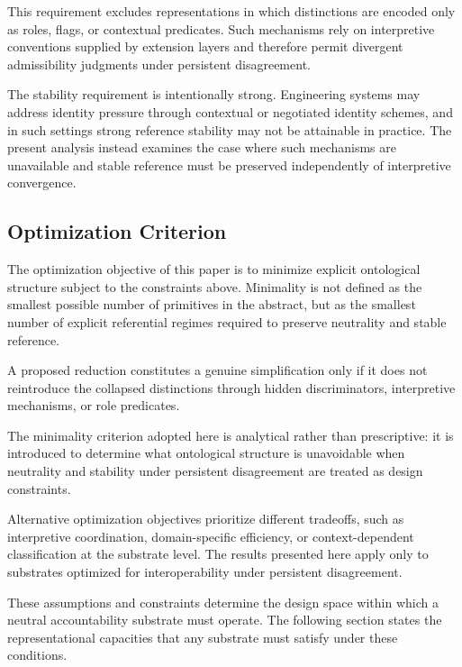This requirement excludes representations in which \stabilitycritical{}
distinctions are encoded only as roles, flags, or contextual predicates.
Such mechanisms rely on interpretive conventions supplied by extension layers
and therefore permit divergent admissibility judgments under persistent
disagreement.

The stability requirement is intentionally strong.
Engineering systems may address identity pressure through contextual
or negotiated identity schemes, and in such settings strong reference
stability may not be attainable in practice.
The present analysis instead examines the case
where such mechanisms are unavailable and
stable reference must be preserved independently of interpretive convergence.

\subsection{Optimization Criterion}

The optimization objective of this paper is to minimize explicit ontological
structure subject to the constraints above.
Minimality is not defined as
the smallest possible number of primitives in the abstract,
but as the smallest number of explicit referential
regimes required to preserve neutrality and stable reference.

A proposed reduction constitutes a genuine simplification only if it does not
reintroduce the collapsed distinctions through hidden discriminators,
interpretive mechanisms, or role predicates.

The minimality criterion adopted here is analytical rather than prescriptive:
it is introduced to determine what ontological structure
is unavoidable when neutrality and stability under persistent disagreement
are treated as design constraints.

Alternative optimization objectives prioritize different tradeoffs, such as
interpretive coordination, domain-specific efficiency, or context-dependent
classification at the substrate level.
The results presented here apply only to substrates optimized for
interoperability under persistent disagreement.

These assumptions and constraints determine the design space
within which a neutral accountability substrate must operate.
The following section states the representational capacities that any
substrate must satisfy under these conditions.
